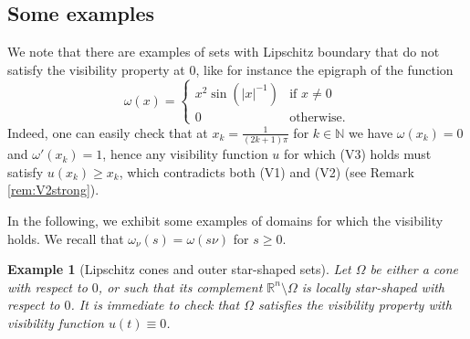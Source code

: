 \documentclass[a4paper,reqno,11pt]{amsart}
\newtheorem{example}[theorem]{Example}
\newcommand{\N}{\mathbb{N}}
\newcommand{\R}{\mathbb{R}}
\begin{document}
\subsection{Some examples} \label{sec:examples}
We note that there are examples of sets with Lipschitz boundary that do not satisfy the visibility property at $0$, like for instance the epigraph of the function 
\[
\omega(x) = \begin{cases}
x^{2}\sin(|x|^{-1}) & \text{if }x\neq 0\\
0 & \text{otherwise.}
\end{cases}
\]
Indeed, one can easily check that at $x_{k} = \frac{1}{(2k+1)\pi}$ for $k\in \N$ we have $\omega(x_{k}) = 0$ and $\omega'(x_{k})=1$, hence any visibility function $u$ for which (V3) holds must satisfy $u(x_{k})\ge x_{k}$, which contradicts both  (V1) and (V2) (see Remark \ref{rem:V2strong}).

In the following, we exhibit some examples of domains for which the visibility holds. We recall that $\omega_{\nu}(s) = \omega(s \nu)$ for $s \geq 0$.

\begin{example}[Lipschitz cones and outer star-shaped sets] \label{ex:Lipcones}
Let $\Omega$ be either a cone with respect to $0$, or such that its complement $\R^{n}\setminus \Omega$ is locally star-shaped with respect to $0$. It is immediate to check that $\Omega$ satisfies the visibility property with visibility function $u(t) \equiv 0$.
\end{example}
	
\end{document}
